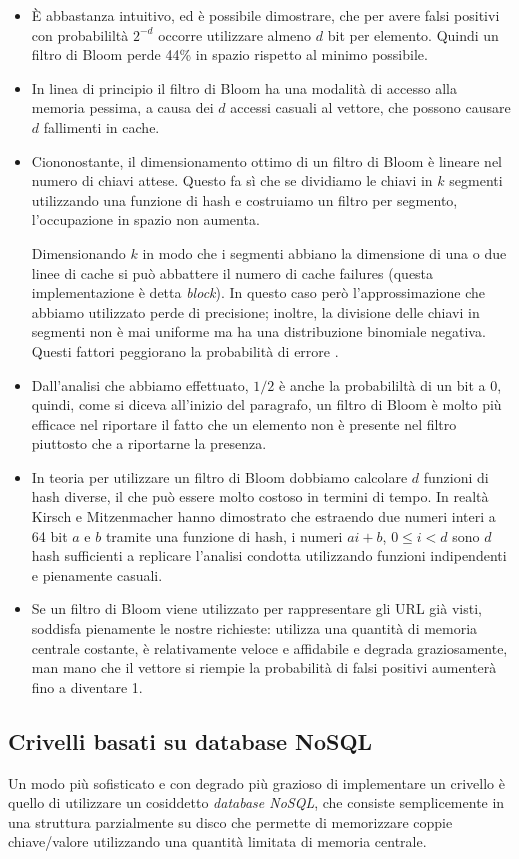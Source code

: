 \begin{itemize}
    \item È abbastanza intuitivo, ed è possibile dimostrare, che per avere falsi positivi con probabililtà $2^{-d}$ occorre utilizzare almeno $d$ bit per elemento. Quindi un filtro di Bloom perde 44\% in spazio rispetto al minimo possibile.
    \item In linea di principio il filtro di Bloom ha una modalità di accesso alla memoria pessima, a causa dei $d$ accessi casuali al vettore, che possono causare $d$ fallimenti in cache.
    \item Ciononostante, il dimensionamento ottimo di un filtro di Bloom è lineare nel numero di chiavi attese. Questo fa sì che se dividiamo le chiavi in $k$ segmenti utilizzando una funzione di hash e costruiamo un filtro per segmento, l'occupazione in spazio non aumenta.

    Dimensionando $k$ in modo che i segmenti abbiano la dimensione di una o due linee di cache si può abbattere il numero di cache failures (questa implementazione è detta \textit{block}). In questo caso però l'approssimazione che abbiamo utilizzato perde di precisione; inoltre, la divisione delle chiavi in segmenti non è mai uniforme ma ha una distribuzione binomiale negativa. Questi fattori peggiorano la probabilità di errore \cite{Putze}.
    \item Dall'analisi che abbiamo effettuato, $1/2$ è anche la probabililtà di un bit a 0, quindi, come si diceva all'inizio del paragrafo, un filtro di Bloom è molto più efficace nel riportare il fatto che un elemento non è presente nel filtro piuttosto che a riportarne la presenza.
    \item In teoria per utilizzare un filtro di Bloom dobbiamo calcolare $d$ funzioni di hash diverse, il che può essere molto costoso in termini di tempo. In realtà Kirsch e Mitzenmacher hanno dimostrato che estraendo due numeri interi a 64 bit $a$ e $b$ tramite una funzione di hash, i numeri $ai + b$, $0 \leq i < d$ sono $d$ hash sufficienti a replicare l'analisi condotta utilizzando funzioni indipendenti e pienamente casuali.
    \item Se un filtro di Bloom viene utilizzato per rappresentare gli URL già visti, soddisfa pienamente le nostre richieste: utilizza una quantità di memoria centrale costante, è relativamente veloce e affidabile e degrada graziosamente, man mano che il vettore si riempie la probabilità di falsi positivi aumenterà fino a diventare 1.
\end{itemize}
\subsection{Crivelli basati su database NoSQL}
Un modo più sofisticato e con degrado più grazioso di implementare un crivello è quello di utilizzare un cosiddetto \textit{database NoSQL}, che consiste semplicemente in una struttura parzialmente su disco che permette di memorizzare coppie chiave/valore utilizzando una quantità limitata di memoria centrale.


